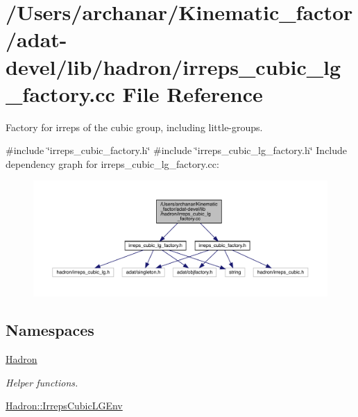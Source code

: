 \hypertarget{adat-devel_2lib_2hadron_2irreps__cubic__lg__factory_8cc}{}\section{/\+Users/archanar/\+Kinematic\+\_\+factor/adat-\/devel/lib/hadron/irreps\+\_\+cubic\+\_\+lg\+\_\+factory.cc File Reference}
\label{adat-devel_2lib_2hadron_2irreps__cubic__lg__factory_8cc}


Factory for irreps of the cubic group, including little-\/groups.  


{\ttfamily \#include \char`\"{}irreps\+\_\+cubic\+\_\+factory.\+h\char`\"{}}\newline
{\ttfamily \#include \char`\"{}irreps\+\_\+cubic\+\_\+lg\+\_\+factory.\+h\char`\"{}}\newline
Include dependency graph for irreps\+\_\+cubic\+\_\+lg\+\_\+factory.\+cc\+:
\nopagebreak
\begin{figure}[H]
\begin{center}
\leavevmode
\includegraphics[width=350pt]{d5/da1/adat-devel_2lib_2hadron_2irreps__cubic__lg__factory_8cc__incl}
\end{center}
\end{figure}
\subsection*{Namespaces}
\begin{DoxyCompactItemize}
\item 
 \mbox{\hyperlink{namespaceHadron}{Hadron}}
\begin{DoxyCompactList}\small\item\em Helper functions. \end{DoxyCompactList}\item 
 \mbox{\hyperlink{namespaceHadron_1_1IrrepsCubicLGEnv}{Hadron\+::\+Irreps\+Cubic\+L\+G\+Env}}
\end{DoxyCompactItemize}
